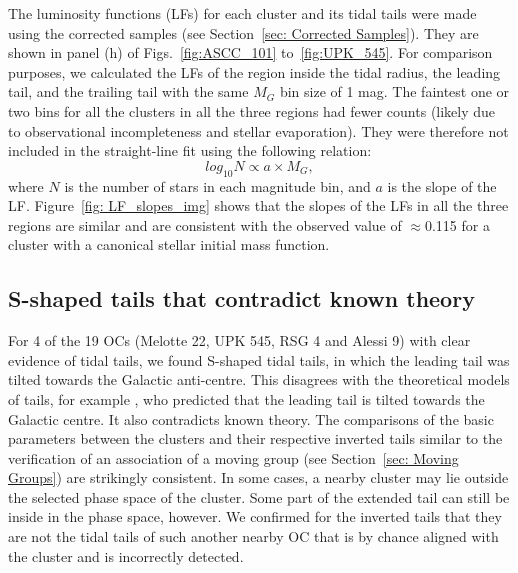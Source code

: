 \documentclass{aa}
\begin{document}
The luminosity functions (LFs) for each cluster and its tidal tails were made using the corrected samples (see Section~\ref{sec: Corrected Samples}). They are shown in panel (h) of Figs.~\ref{fig:ASCC_101} to~\ref{fig:UPK_545}. For comparison purposes, we calculated the LFs of the region inside the tidal radius, the leading tail, and the trailing tail with the same $M_G$ bin size of 1 mag. 
The faintest one or two bins for all the clusters in all the three regions had fewer counts (likely due to observational incompleteness and stellar evaporation). They were therefore not included in the straight-line fit using the following relation:
\begin{equation}
    log_{10} N \propto a \times M_{G},
\end{equation}
where $N$ is the number of stars in each magnitude bin, and $a$ is the slope of the LF. Figure~\ref{fig: LF_slopes_img} shows that the slopes of the LFs in all the three regions are similar and are consistent with the observed value of $\approx$0.115 for a cluster with a canonical \citet{2001MNRAS.322..231KroupaIMF} stellar initial mass function.


\subsection{S-shaped tails that contradict known theory }
For 4 of the 19 OCs (Melotte 22, UPK 545, RSG 4 and Alessi 9) with clear evidence of tidal tails, we found S-shaped tidal tails, in which the leading tail was tilted towards the Galactic anti-centre. This disagrees with the theoretical models of tails, for example \citep{2020A&A...640A..84Dinnbier,2020MNRAS.497..536Wang,2021A&A...647A.137Jerabkova}, who predicted that the leading tail is tilted towards the Galactic centre. It also contradicts known theory. The comparisons of the basic parameters between the clusters and their respective inverted tails similar to the verification of an association of a moving group (see Section~\ref{sec: Moving Groups}) are strikingly consistent. In some cases, a nearby cluster may lie outside the selected phase space of the cluster. Some part of the extended tail can still be inside in the phase space, however. We confirmed for the inverted tails that they are not the tidal tails of such another nearby OC that is by chance aligned with the cluster and is incorrectly detected.  
\end{document}
